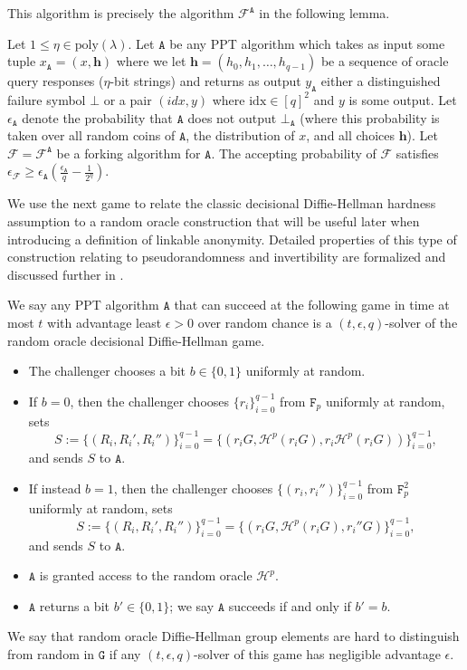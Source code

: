 \documentclass{llncs}
\newcommand{\A}{\texttt{A}}
\newcommand{\F}{\texttt{F}_p}
\newcommand{\G}{\texttt{G}}
\newcommand{\Hp}{\mathcal{H}^p}
\begin{document}
This algorithm is precisely the algorithm $\mathcal{F}^{\A}$ in the following lemma.

\begin{lemma}\label{lem:fork}
Let $1 \leq \eta \in \text{poly}(\lambda)$. Let $\A$ be any PPT algorithm which takes as input some tuple $x_\A = (x, \textbf{h})$ where we let $\textbf{h} = (h_0, h_1, \ldots, h_{q-1})$ be a sequence of oracle query responses ($\eta$-bit strings) and returns as output $y_{\A}$ either a distinguished failure symbol $\bot$ or a pair $(\textit{idx}, y)$ where $\text{idx} \in [q]^2$ and $y$ is some output. Let $\epsilon_{\A}$ denote the probability that $\A$ does not output $\bot_{\A}$ (where this probability is taken over all random coins of $\A$, the distribution of $x$, and all choices $\textbf{h}$). Let $\mathcal{F} = \mathcal{F}^{\A}$ be a forking algorithm for $\A$. The accepting probability of $\mathcal{F}$ satisfies $\epsilon_{\mathcal{F}} \geq \epsilon_{\A} \left(\frac{\epsilon_{\A}}{q} - \frac{1}{2^\eta}\right)$.
\end{lemma}

We use the next game to relate the classic decisional Diffie-Hellman hardness assumption to a random oracle construction that will be useful later when introducing a definition of linkable anonymity. Detailed properties of this type of construction relating to pseudorandomness and invertibility are formalized and discussed further in \cite{omniring}.

\begin{definition}\label{def:rom-ddh}
We say any PPT algorithm $\A$ that can succeed at the following game in time at most $t$ with advantage least $\epsilon > 0$ over random chance is a $(t,\epsilon,q)$-solver of the random oracle decisional Diffie-Hellman game.
\begin{itemize}
\item The challenger chooses a bit $b \in \{0,1\}$ uniformly at random.
\item If $b = 0$, then the challenger chooses $\{r_i\}_{i=0}^{q-1}$ from $\F$ uniformly at random, sets $$S := \{(R_i,R_i',R_i'')\}_{i=0}^{q-1} = \{(r_iG,\Hp(r_iG),r_i\Hp(r_iG))\}_{i=0}^{q-1},$$ and sends $S$ to $\A$.
\item If instead $b = 1$, then the challenger chooses $\{(r_i,r_i'')\}_{i=0}^{q-1}$ from $\F^2$ uniformly at random, sets $$S := \{(R_i,R_i',R_i'')\}_{i=0}^{q-1} = \{(r_iG,\Hp(r_iG),r_i''G)\}_{i=0}^{q-1},$$ and sends $S$ to $\A$.
\item $\A$ is granted access to the random oracle $\Hp$.
\item $\A$ returns a bit $b' \in \{0,1\}$; we say $\A$ succeeds if and only if $b' = b$.
\end{itemize}
We say that random oracle Diffie-Hellman group elements are hard to distinguish from random in $\G$ if any $(t,\epsilon,q)$-solver of this game has negligible advantage $\epsilon$.
\end{definition}
\end{document}
